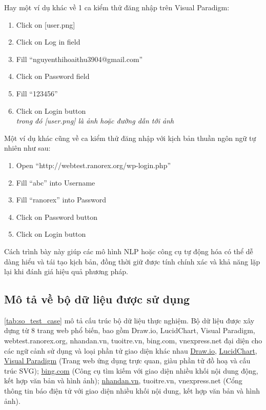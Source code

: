 \documentclass[a4paper, 12pt]{report}
\begin{document}
{\clearpage

Hay một ví dụ khác về 1 ca kiểm thử đăng nhập trên Visual Paradigm:

\begin{enumerate}[itemsep=0pt, parsep=0pt, leftmargin=3em]
    \item Click on [user.png]
    \item Click on Log in field
    \item Fill ``nguyenthihoaithu3904@gmail.com'' 
    \item Click on Password field
    \item Fill ``123456''
    \item Click on Login button \\
    \textit{trong đó [user.png] là ảnh hoặc đường dẫn tới ảnh}
\end{enumerate}


Một ví dụ khác cũng về ca kiểm thử đăng nhập với kịch bản thuần ngôn ngữ tự nhiên như sau: 

\begin{enumerate}[itemsep=0pt, parsep=0pt, leftmargin=3em]
    \item Open ``http://webtest.ranorex.org/wp-login.php''
    \item Fill ``abc'' into Username
    \item Fill ``ranorex'' into Password 
    \item Click on Password button
    \item Click on Login button 
\end{enumerate}

Cách trình bày này giúp các mô hình NLP hoặc công cụ tự động hóa có thể dễ dàng hiểu và tái tạo kịch bản, đồng thời giữ được tính chính xác và khả năng lặp lại khi đánh giá hiệu quả phương pháp.



\subsection{Mô tả về bộ dữ liệu được sử dụng}

\par{ \autoref{tab:so_test_case} mô tả cấu trúc bộ dữ liệu thực nghiệm. Bộ dữ liệu được xây dựng từ 8 trang web phổ biến, bao gồm Draw.io, LucidChart, Visual Paradigm, webtest.ranorex.org, nhandan.vn, tuoitre.vn, bing.com, vnexpress.net đại diện cho các ngữ cảnh sử dụng và loại phần tử giao diện khác nhau \href{https://app.diagrams.net/}{Draw.io}, \href{https://lucid.app/}{LucidChart}, \href{https://www.visual-paradigm.com/}{Visual Paradigm} (Trang web ứng dụng trực quan, giàu phần tử đồ hoạ và cấu trúc SVG); \href{https://www.bing.com/}{bing.com} (Công cụ tìm kiếm với giao diện nhiều khối nội dung động, kết hợp văn bản và hình ảnh); \href{https://nhandan.vn/}{nhandan.vn}, tuoitre.vn, vnexpress.net (Cổng thông tin báo điện tử với giao diện nhiều khối nội dung, kết hợp văn bản và hình ảnh).


}}
\end{document}
